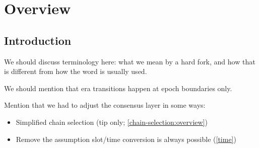 \chapter{Overview}
\label{hfc}

\section{Introduction}
\label{hfc:intro}

\todo{} We should discuss terminology here: what we mean by a hard fork,
and how that is different from how the word is usually used.

We should mention that era transitions happen at epoch boundaries only.

Mention that we had to adjust the consensus layer in some ways:

\begin{itemize}
\item Simplified chain selection (tip only; \cref{chain-selection:overview})
\item Remove the assumption slot/time conversion is always possible (\cref{time})
\end{itemize}
